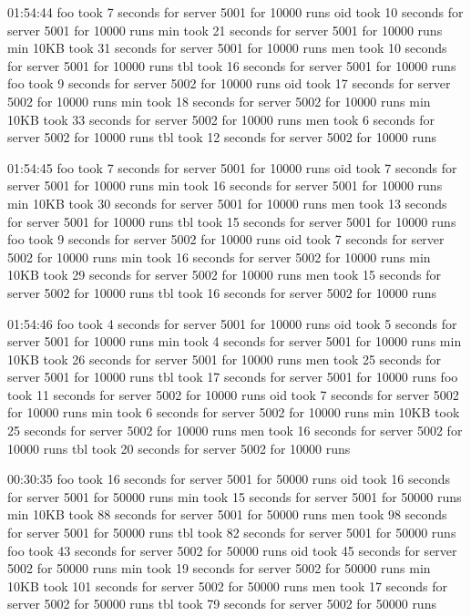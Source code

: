 \documentclass[11pt]{article}
\begin{document}
01:54:44
foo took 7 seconds for server 5001 for 10000 runs
oid took 10 seconds for server 5001 for 10000 runs
min took 21 seconds for server 5001 for 10000 runs
min 10KB took 31 seconds for server 5001 for 10000 runs
men took 10 seconds for server 5001 for 10000 runs
tbl took 16 seconds for server 5001 for 10000 runs
foo took 9 seconds for server 5002 for 10000 runs
oid took 17 seconds for server 5002 for 10000 runs
min took 18 seconds for server 5002 for 10000 runs
min 10KB took 33 seconds for server 5002 for 10000 runs
men took 6 seconds for server 5002 for 10000 runs
tbl took 12 seconds for server 5002 for 10000 runs

01:54:45
foo took 7 seconds for server 5001 for 10000 runs
oid took 7 seconds for server 5001 for 10000 runs
min took 16 seconds for server 5001 for 10000 runs
min 10KB took 30 seconds for server 5001 for 10000 runs
men took 13 seconds for server 5001 for 10000 runs
tbl took 15 seconds for server 5001 for 10000 runs
foo took 9 seconds for server 5002 for 10000 runs
oid took 7 seconds for server 5002 for 10000 runs
min took 16 seconds for server 5002 for 10000 runs
min 10KB took 29 seconds for server 5002 for 10000 runs
men took 15 seconds for server 5002 for 10000 runs
tbl took 16 seconds for server 5002 for 10000 runs

01:54:46
foo took 4 seconds for server 5001 for 10000 runs
oid took 5 seconds for server 5001 for 10000 runs
min took 4 seconds for server 5001 for 10000 runs
min 10KB took 26 seconds for server 5001 for 10000 runs
men took 25 seconds for server 5001 for 10000 runs
tbl took 17 seconds for server 5001 for 10000 runs
foo took 11 seconds for server 5002 for 10000 runs
oid took 7 seconds for server 5002 for 10000 runs
min took 6 seconds for server 5002 for 10000 runs
min 10KB took 25 seconds for server 5002 for 10000 runs
men took 16 seconds for server 5002 for 10000 runs
tbl took 20 seconds for server 5002 for 10000 runs


00:30:35
foo took 16 seconds for server 5001 for 50000 runs
oid took 16 seconds for server 5001 for 50000 runs
min took 15 seconds for server 5001 for 50000 runs
min 10KB took 88 seconds for server 5001 for 50000 runs
men took 98 seconds for server 5001 for 50000 runs
tbl took 82 seconds for server 5001 for 50000 runs
foo took 43 seconds for server 5002 for 50000 runs
oid took 45 seconds for server 5002 for 50000 runs
min took 19 seconds for server 5002 for 50000 runs
min 10KB took 101 seconds for server 5002 for 50000 runs
men took 17 seconds for server 5002 for 50000 runs
tbl took 79 seconds for server 5002 for 50000 runs
\end{document}
